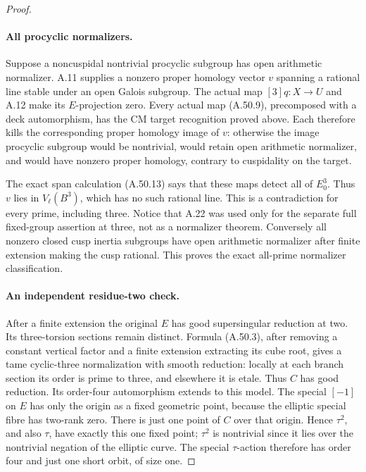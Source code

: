 \begin{proof}
\paragraph{All procyclic normalizers.}
Suppose a noncuspidal nontrivial procyclic subgroup
has open arithmetic normalizer. A.11 supplies a
nonzero proper homology vector \(v\) spanning
a rational line stable under an open Galois
subgroup. The actual map \([3]q:X\to U\)
and A.12 make its \(E\)-projection zero.
Every actual map (A.50.9), precomposed with a deck
automorphism, has the CM target recognition proved
above. Each therefore kills the corresponding
proper homology image of \(v\): otherwise the
image procyclic subgroup would be nontrivial,
would retain open arithmetic normalizer, and
would have nonzero proper homology, contrary to
cuspidality on the target.

The exact span calculation (A.50.13) says that these
maps detect all of \(E_0^3\). Thus \(v\) lies
in \(V_\ell(B^3)\), which has no such rational
line. This is a contradiction for every prime,
including three. Notice that A.22 was used only
for the separate full fixed-group assertion at
three, not as a normalizer theorem. Conversely
all nonzero closed cusp inertia subgroups have
open arithmetic normalizer after finite extension
making the cusp rational. This proves the exact
all-prime normalizer classification.

\paragraph{An independent residue-two check.}
After a finite extension the original \(E\) has
good supersingular reduction at two. Its three-torsion
sections remain distinct. Formula (A.50.3), after
removing a constant vertical factor and a finite
extension extracting its cube root, gives a tame
cyclic-three normalization with smooth reduction:
locally at each branch section its order is prime
to three, and elsewhere it is etale. Thus \(C\)
has good reduction. Its order-four automorphism
extends to this model. The special \([-1]\) on
\(E\) has only the origin as a fixed geometric
point, because the elliptic special fibre has
two-rank zero. There is just one point of \(C\)
over that origin. Hence \(\tau^2\), and also
\(\tau\), have exactly this one fixed point;
\(\tau^2\) is nontrivial since it lies over
the nontrivial negation of the elliptic curve.
The special \(\tau\)-action therefore has
order four and just one short orbit, of size one.


\end{proof}
